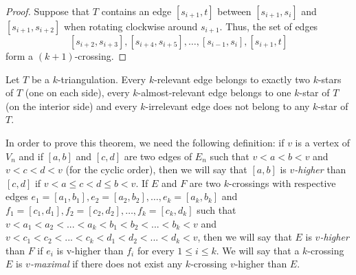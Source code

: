 \documentclass[12pt]{amsart}
\begin{document}
\begin{proof}
Suppose that $T$ contains an edge $[s_{i+1},t]$ between $[s_{i+1},s_{i}]$ and $[s_{i+1},s_{i+2}]$ when rotating clockwise around $s_{i+1}$. Thus, the set of edges $$[s_{i+2},s_{i+3}],[s_{i+4},s_{i+5}],\ldots,[s_{i-1},s_{i}],[s_{i+1},t]$$ form a $(k+1)$-crossing.
\end{proof}

\begin{theorem}\label{incidences}
Let $T$ be a $k$-triangulation. Every $k$-relevant edge belongs to exactly two $k$-stars of $T$ (one on each side), every $k$-almost-relevant edge belongs to one $k$-star of $T$ (on the interior side) and every $k$-irrelevant edge does not belong to any $k$-star of $T$.
\end{theorem}

In order to prove this theorem, we need the following definition: if $v$ is a vertex of $V_n$ and if $[a,b]$ and $[c,d]$ are two edges of $E_n$ such that $v<a<b<v$ and $v<c<d<v$ (for the cyclic order), then we will say that $[a,b]$ is \emph{$v$-higher} than $[c,d]$ if $v<a\le c<d\le b<v$. If $E$ and $F$ are two $k$-crossings with respective edges $e_1=[a_1,b_1],e_2=[a_2,b_2],\ldots,e_k=[a_k,b_k]$ and $f_1=[c_1,d_1],f_2=[c_2,d_2],\ldots,f_k=[c_k,d_k]$ such that $v<a_1<a_2<...<a_k<b_1<b_2<...<b_k<v$ and $v<c_1<c_2<...<c_k<d_1<d_2<...<d_k<v$, then we will say that $E$ is \emph{$v$-higher} than $F$ if $e_i$ is v-higher than $f_i$ for every $1\le i\le k$. We will say that a $k$-crossing $E$ is \emph{$v$-maximal} if there does not exist any $k$-crossing $v$-higher than $E$.
\end{document}
